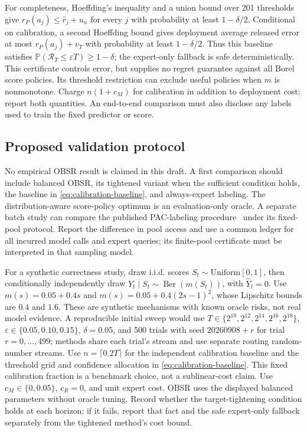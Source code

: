 \documentclass[11pt]{article}
\theoremstyle{remark}
\newcommand{\Pp}{\mathbb P}
\newcommand{\Ber}{\operatorname{Ber}}
\newcommand{\calR}{\mathcal R}
\newcommand{\eps}{\varepsilon}
\begin{document}
For completeness, Hoeffding's inequality and a union bound over 201
thresholds give $r_P(a_j)\le\widehat r_j+u_n$ for every $j$ with
probability at least $1-\delta/2$. Conditional on calibration, a second
Hoeffding bound gives deployment average released error at most
$r_P(a_j)+v_T$ with probability at least $1-\delta/2$. Thus this
baseline satisfies $\Pp(\calR_T\le\eps T)\ge1-\delta$; the
expert-only fallback is safe deterministically. This certificate controls
error, but supplies no regret guarantee against all Borel score policies.
Its threshold restriction can exclude useful policies when $m$ is
nonmonotone. Charge $n(1+c_M)$ for calibration in addition to deployment
cost; report both quantities. An end-to-end comparison must also disclose
any labels used to train the fixed predictor or score.

\subsection{Proposed validation protocol}

No empirical OBSR result is claimed in this draft. A first comparison
should include balanced OBSR, its tightened variant when the sufficient
condition holds, the baseline in \eqref{eq:calibration-baseline}, and
always-expert labeling. The distribution-aware score-policy optimum is
an evaluation-only oracle. A separate batch study can compare the
published PAC-labeling procedure~\cite{paclabels} under its fixed-pool
protocol. Report the difference in pool access and use a common ledger
for all incurred model calls and expert queries; its finite-pool
certificate must be interpreted in that sampling model.

For a synthetic correctness study, draw i.i.d. scores
$S_t\sim\mathrm{Uniform}[0,1]$, then conditionally independently draw
$Y_t\mid S_t\sim\Ber(m(S_t))$, with $\widehat Y_t=0$.
Use $m(s)=0.05+0.4s$ and
$m(s)=0.05+0.4(2s-1)^2$, whose Lipschitz bounds are $0.4$ and $1.6$.
These are synthetic mechanisms with known oracle risks, not real model
evidence. A reproducible initial sweep would use
$T\in\{2^{10},2^{12},2^{14},2^{16},2^{18}\}$,
$\eps\in\{0.05,0.10,0.15\}$, $\delta=0.05$, and 500 trials
with seed $20260908+r$ for trial $r=0,\ldots,499$; methods share each
trial's stream and use separate routing random-number streams.
Use $n=\lceil0.2T\rceil$ for the independent calibration baseline and
the threshold grid and confidence allocation in
\eqref{eq:calibration-baseline}. This fixed calibration fraction is a
benchmark choice, not a sublinear-cost claim. Use $c_M\in\{0,0.05\}$,
$c_R=0$, and unit expert cost. OBSR uses the displayed balanced parameters
without oracle tuning. Record whether the target-tightening condition
holds at each horizon; if it fails, report that fact and the safe
expert-only fallback separately from the tightened method's cost bound.
\end{document}
